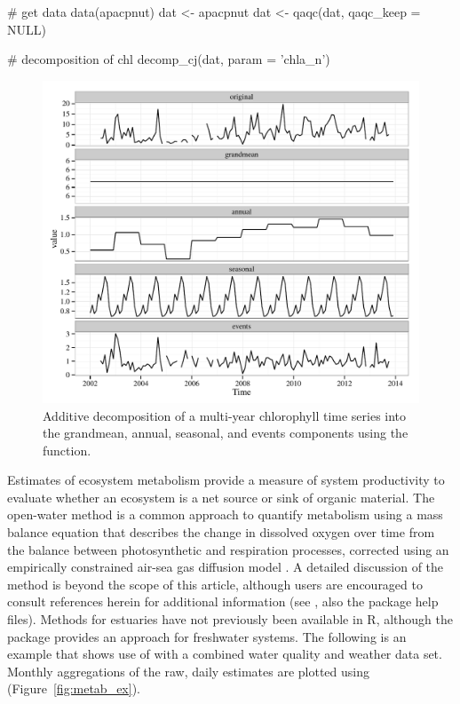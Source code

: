 \begin{example}
# get data
data(apacpnut)
dat <- apacpnut
dat <- qaqc(dat, qaqc_keep = NULL)

# decomposition of chl
decomp_cj(dat, param = 'chla_n')
\end{example}

\begin{figure}[!h]

{\centering \includegraphics[width=\textwidth]{decomp_ex2-1} 

}

\caption[Additive decomposition of a multi-year chlorophyll time series into the grandmean, annual, seasonal, and events components using the  function]{Additive decomposition of a multi-year chlorophyll time series into the grandmean, annual, seasonal, and events components using the  function.}\label{fig:decomp_ex2}
\end{figure}

Estimates of ecosystem metabolism provide a measure of system productivity to evaluate whether an ecosystem is a net source or sink of organic material.  The open-water method \citep{Odum56} is a common approach to quantify metabolism using a mass balance equation that describes the change in dissolved oxygen over time from the balance between photosynthetic and respiration processes, corrected using an empirically constrained air-sea gas diffusion model \citep{Ro06,Thebault08}. A detailed discussion of the method is beyond the scope of this article, although users are encouraged to consult references herein for additional information (see \citet{Kemp12,Needoba12,Caffrey14}, also the package help files).  Methods for estuaries have not previously been available in R, although the  package provides an approach for freshwater systems.  The following is an example that shows use of  with a combined water quality and weather data set.  Monthly aggregations of the raw, daily estimates are plotted using  (Figure~\ref{fig:metab_ex}).


